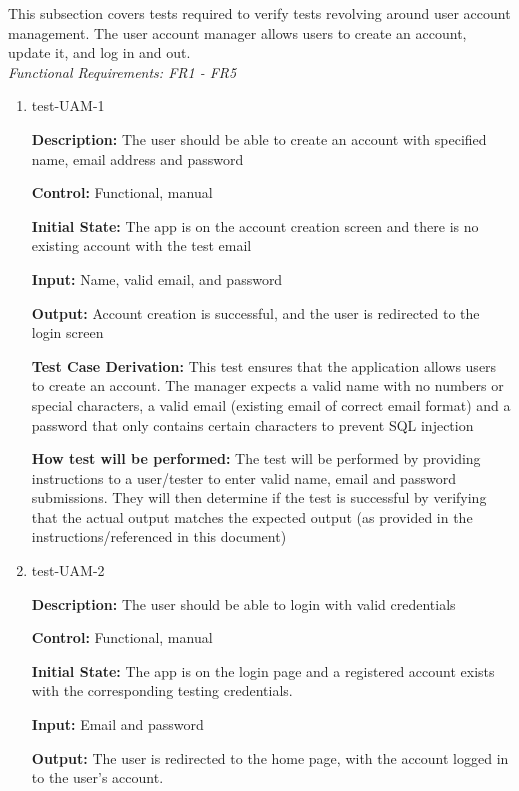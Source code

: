 \documentclass[12pt, titlepage]{article}
\begin{document}
This subsection covers tests required to verify tests revolving around user account management. The user account manager allows users to create an account, update it, and log in and out.\\
\textit{Functional Requirements: FR1 - FR5}

\begin{enumerate}

\item{test-UAM-1\\}

\textbf{Description:} The user should be able to create an account with specified name, email address and password

\textbf{Control:} Functional, manual
					
\textbf{Initial State:} The app is on the account creation screen and there is no existing account with the test email
					
\textbf{Input:} Name, valid email, and password
					
\textbf{Output:} Account creation is successful, and the user is redirected to the login screen

\textbf{Test Case Derivation:} This test ensures that the application allows users to create an account. The manager expects a valid name with no numbers or special characters, a valid email (existing email of correct email format) and a password that only contains certain characters to prevent SQL injection
					
\textbf{How test will be performed:} The test will be performed by providing instructions to a user/tester to enter valid name, email and password submissions. They will then determine if the test is successful by verifying that the actual output matches the expected output (as provided in the instructions/referenced in this document)

\item{test-UAM-2\\}

\textbf{Description:} The user should be able to login with valid credentials

\textbf{Control:} Functional, manual
					
\textbf{Initial State:} The app is on the login page and a registered account
exists with the corresponding testing credentials.
					
\textbf{Input:} Email and password
					
\textbf{Output:} The user is redirected to the home page, with the account
logged in to the user's account.


\end{enumerate}
\end{document}
